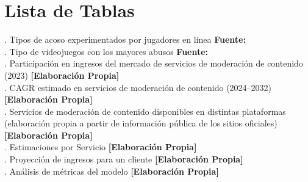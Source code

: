 \chapter*{Lista de Tablas}

. Tipos de acoso experimentados por jugadores en línea \textbf{Fuente:} \cite{preply2022games} \\
. Tipo de videojuegos con los mayores abusos \textbf{Fuente:} \cite{preply2022games} \\
. Participación en ingresos del mercado de servicios de moderación de contenido (2023) \textbf{[Elaboración Propia]} \\
. CAGR estimado en servicios de moderación de contenido (2024--2032) \textbf{[Elaboración Propia]} \\[0.2cm]

. Servicios de moderación de contenido disponibles en distintas plataformas (elaboración propia a partir de información pública de los sitios oficiales) \textbf{[Elaboración Propia]} \\[0.2cm]

. Estimaciones por Servicio \textbf{[Elaboración Propia]} \\
. Proyección de ingresos para un cliente \textbf{[Elaboración Propia]} \\[0.2cm]

. Análisis de métricas del modelo \textbf{[Elaboración Propia]} 




